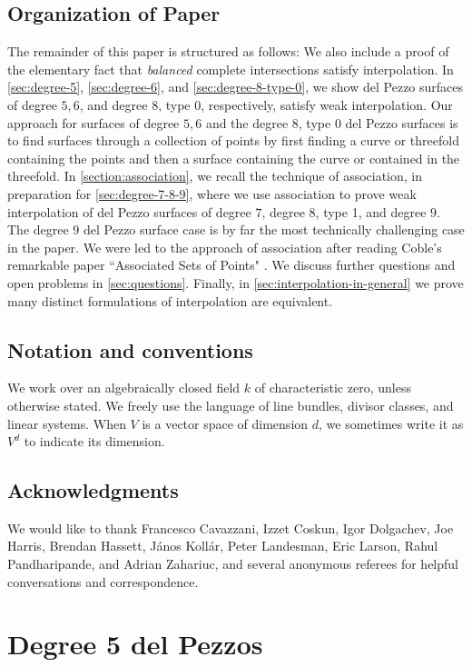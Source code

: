 \documentclass[reqno, 11pt]{amsart}
\theoremstyle{definition}
\theoremstyle{remark}
\numberwithin{equation}{section}
\numberwithin{thm}{section}
\numberwithin{prop}{section}
\numberwithin{lem}{section}
\numberwithin{cor}{section}
\numberwithin{conj}{section}
\numberwithin{defn}{section}
\theoremstyle{plain}
\theoremstyle{definition}
\newcommand\ssec{\subsection}
\begin{document}
\ssec{Organization of Paper}

The remainder of this paper is structured as follows:
We also
include a proof of the elementary fact that {\sl balanced} complete intersections satisfy interpolation.
In \autoref{sec:degree-5}, \autoref{sec:degree-6}, and \autoref{sec:degree-8-type-0}, we show del Pezzo surfaces of degree $5, 6$, and degree $8$, type $0$,
respectively,
satisfy weak interpolation. Our approach for
surfaces of degree $5,6$ and the degree $8$, type $0$ del Pezzo
surfaces is to find surfaces
through a collection of points by first finding a curve or threefold
containing the points and then a surface containing the curve or contained
in the threefold.
In \autoref{section:association}, we recall the technique
of association, in preparation for \autoref{sec:degree-7-8-9},
where we use association to prove weak interpolation of
del Pezzo surfaces of degree $7$, degree $8$, type 1, and degree $9$.  The degree $9$ del Pezzo surface case is by far the most technically challenging case in the paper. 
We were led to the approach of association after reading Coble's remarkable paper ``Associated Sets of Points" \cite{coble:associated-sets-of-points}. We discuss further questions and open problems in \autoref{sec:questions}.
Finally, in \autoref{sec:interpolation-in-general} we prove many distinct formulations of interpolation are equivalent. 

\subsection{Notation and conventions} We work over an algebraically closed field $k$ of characteristic zero, unless otherwise stated. We freely use the language of line bundles, divisor classes, and linear systems. When $V$ is a vector space of dimension $d$,
we sometimes write it as $V^d$ to indicate its dimension.

\subsection{Acknowledgments} We would like to thank Francesco Cavazzani, Izzet Coskun, Igor Dolgachev, Joe Harris, Brendan Hassett, J\'anos Koll\'ar,
Peter Landesman, Eric Larson, Rahul Pandharipande, and Adrian Zahariuc, and several anonymous referees for helpful conversations and correspondence.


\section{Degree 5 del Pezzos}
\end{document}
